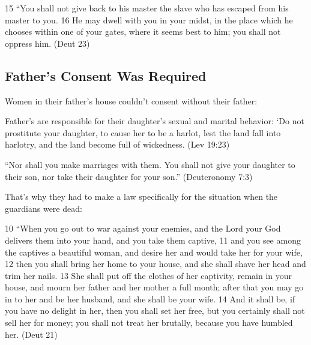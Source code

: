 \documentclass[11pt]{article}
\begin{document}
15 “You shall not give back to his master the slave who has escaped from his master to you. 16 He may dwell with you in your midst, in the place which he chooses within one of your gates, where it seems best to him; you shall not oppress him. (Deut 23)



\subsection{Father's Consent Was Required}

Women in their father’s house couldn’t consent without their father: 
 

Father’s are responsible for their daughter’s sexual and marital behavior:
‘Do not prostitute your daughter, to cause her to be a harlot, lest the land fall into harlotry, and the land become full of wickedness. (Lev 19:23)


“Nor shall you make marriages with them. You shall not give your daughter to their son, nor take their daughter for your son.”
(Deuteronomy 7:3)


That’s why they had to make a law specifically for the situation when the guardians were dead:


10 “When you go out to war against your enemies, and the Lord your God delivers them into your hand, and you take them captive, 11 and you see among the captives a beautiful woman, and desire her and would take her for your wife, 12 then you shall bring her home to your house, and she shall shave her head and trim her nails. 13 She shall put off the clothes of her captivity, remain in your house, and mourn her father and her mother a full month; after that you may go in to her and be her husband, and she shall be your wife. 14 And it shall be, if you have no delight in her, then you shall set her free, but you certainly shall not sell her for money; you shall not treat her brutally, because you have humbled her. (Deut 21)
\end{document}
